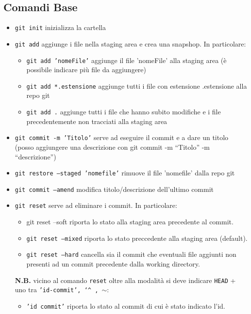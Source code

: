 \documentclass[12pt, a4paper]{article}
\begin{document}
\subsection{Comandi Base}
\begin{itemize}
    \item \texttt{git init} inizializza la cartella
    \item \texttt{git add} aggiunge i file nella staging area e crea una snapshop. In particolare:
    \begin{itemize}
        \item[] \texttt{git add 'nomeFile'} aggiunge il file 'nomeFile' alla staging area (è possibile indicare più file da aggiungere)
        \item[] \texttt{git add *.estensione} aggiunge tutti i file con estensione .estensione alla repo git
        \item[] \texttt{git add .} aggiunge tutti i file che hanno subito modifiche e i file precedentemente non tracciati alla staging area
    \end{itemize}
    \item \texttt{git commit -m 'Titolo'} serve ad eseguire il commit e a dare un titolo (posso aggiungere una descrizione con git commit -m “Titolo” -m “descrizione”)
    \item \texttt{git restore --staged 'nomefile'} rimuove il file 'nomefile' dalla repo git
    \item \texttt{git commit --amend} modifica titolo/descrizione dell'ultimo commit
    \item \texttt{git reset} serve ad eliminare i commit. In particolare:
    \begin{itemize}
        \item[] \texttt{}{git reset --soft} riporta lo stato alla staging area precedente al commit.
        \item[] \texttt{git reset --mixed} riporta lo stato preccedente alla staging area (default).
        \item[] \texttt{git reset --hard} cancella sia il commit che eventuali file aggiunti non presenti ad un commit precedente dalla working directory.
    \end{itemize}
    \textbf{N.B.} vicino al comando \texttt{reset} oltre alla modalità si deve indicare \texttt{HEAD} + uno tra \texttt{'id-commit', \char`^\ , $\sim$}:
    \begin{itemize}
        \item[] \texttt{'id commit'} riporta lo stato al commit di cui è stato indicato l’id.

\end{itemize}
\end{itemize}
\end{document}
